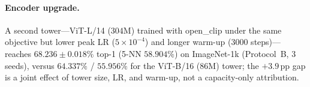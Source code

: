 \paragraph{Encoder upgrade.}
A second tower---ViT-L/14 ($304$M) trained with open\_clip under the same objective but lower peak LR ($5{\times}10^{-4}$) and longer warm-up ($3000$ steps)---reaches $\mathbf{68.236\pm0.018\%}$ top-1 (5-NN $58.904\%$) on ImageNet-1k (Protocol~B, 3 seeds), versus $64.337\%$ / $55.956\%$ for the ViT-B/16 ($86$M) tower; the $+3.9$\,pp gap is a joint effect of tower size, LR, and warm-up, not a capacity-only attribution.

